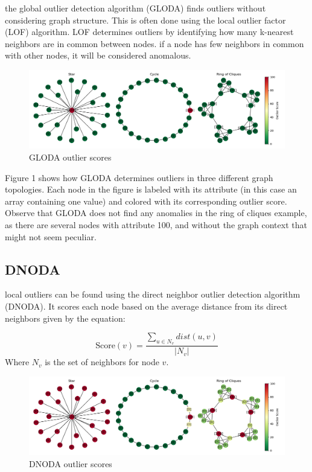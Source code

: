 \documentclass[10pt,letterpaper]{article}
\begin{document}
the global outlier detection algorithm (GLODA) finds outliers without considering
graph structure. This is often done using the local outlier factor (LOF)
algorithm\cite{LOF}. LOF determines outliers by identifying how many
k-nearest neighbors are in common between nodes. if a node has few neighbors in
common with other nodes, it will be considered anomalous.

\begin{figure}[ht]
\includegraphics[width=\textwidth]{"../graphics/GLODAExample.png"}
\caption{GLODA outlier scores}
\end{figure}

Figure 1 shows how
GLODA determines outliers in three different graph topologies. Each node in the
figure is labeled with its attribute (in this case an array containing one value)
and colored with its corresponding outlier score. Observe that GLODA does not
find any anomalies in the ring of cliques example, as there are several nodes
with attribute 100, and without the graph context that might not seem peculiar.

\subsection{DNODA}

local outliers can be found using the direct neighbor outlier detection algorithm
(DNODA). It scores each node based on the average distance from its direct
neighbors given by the equation:

$$ \text{Score}(v) = \frac{ \sum_{u \in N_v} dist(u, v) }{|N_v|} $$
Where $N_v$ is the set of neighbors for node $v$.

\begin{figure}[ht]
\includegraphics[width=\textwidth]{"../graphics/DNODAExample.png"}
\caption{DNODA outlier scores}
\end{figure}
\end{document}
